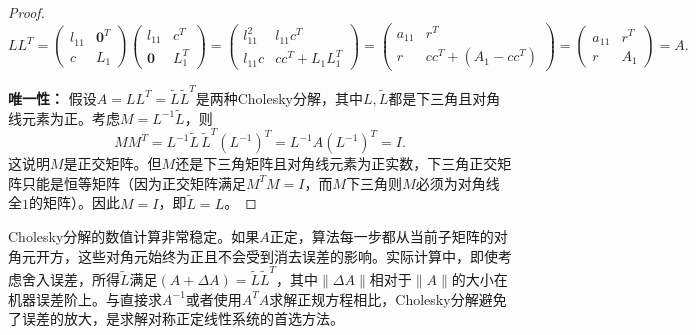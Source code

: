 \begin{proof}
	\[ LL^T = \begin{pmatrix} l_{11} & \mathbf{0}^T \\ c & L_1 \end{pmatrix}
	\begin{pmatrix} l_{11} & c^T \\ \mathbf{0} & L_1^T \end{pmatrix}
	= \begin{pmatrix} l_{11}^2 & l_{11} c^T \\ l_{11} c & cc^T + L_1 L_1^T \end{pmatrix}
	= \begin{pmatrix} a_{11} & r^T \\ r & cc^T + (A_1 - cc^T) \end{pmatrix}
	= \begin{pmatrix} a_{11} & r^T \\ r & A_1 \end{pmatrix} = A.
	\]
	
	\textbf{唯一性：} 假设$A=L L^T=\tilde{L}\tilde{L}^T$是两种Cholesky分解，其中$L,\tilde{L}$都是下三角且对角线元素为正。考虑$M=L^{-1}\tilde{L}$，则
	\[ M M^T = L^{-1} \tilde{L}\,\tilde{L}^T (L^{-1})^T = L^{-1} A (L^{-1})^T = I. \] 
	这说明$M$是正交矩阵。但$M$还是下三角矩阵且对角线元素为正实数，下三角正交矩阵只能是恒等矩阵（因为正交矩阵满足$M^T M=I$，而$M$下三角则$M$必须为对角线全$1$的矩阵）。因此$M=I$，即$\tilde{L}=L$。
\end{proof}


\begin{note}
	Cholesky分解的数值计算非常稳定。如果$A$正定，算法每一步都从当前子矩阵的对角元开方，这些对角元始终为正且不会受到消去误差的影响。实际计算中，即使考虑舍入误差，所得$\tilde{L}$满足$(A+\Delta A) = \tilde{L}\tilde{L}^T$，其中$\|\Delta A\|$相对于$\|A\|$的大小在机器误差阶上。与直接求$A^{-1}$或者使用$A^TA$求解正规方程相比，Cholesky分解避免了误差的放大，是求解对称正定线性系统的首选方法。
\end{note}

